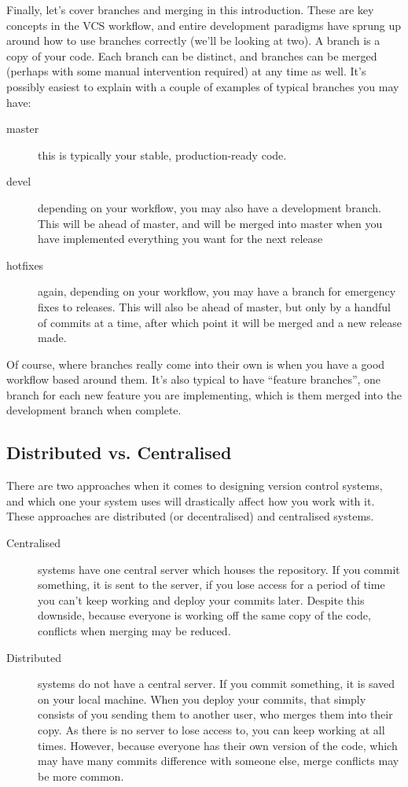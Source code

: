 \documentclass[12pt,a4paper]{article}
\begin{document}
Finally, let's cover branches and merging in this introduction. These
are key concepts in the VCS workflow, and entire development paradigms
have sprung up around how to use branches correctly (we'll be looking
at two). A branch is a copy of your code. Each branch can be distinct,
and branches can be merged (perhaps with some manual intervention
required) at any time as well. It's possibly easiest to explain with
a couple of examples of typical branches you may have:

\begin{description}
  \item[master] this is typically your stable, production-ready
    code.
  \item[devel] depending on your workflow, you may also have a
    development branch. This will be ahead of master, and will be
    merged into master when you have implemented everything you want
    for the next release
  \item[hotfixes] again, depending on your workflow, you may have a
    branch for emergency fixes to releases. This will also be ahead of
    master, but only by a handful of commits at a time, after which
    point it will be merged and a new release made.
\end{description}

Of course, where branches really come into their own is when you have
a good workflow based around them. It's also typical to have ``feature
branches'', one branch for each new feature you are implementing,
which is them merged into the development branch when complete.

\subsection{Distributed vs. Centralised}

There are two approaches when it comes to designing version control
systems, and which one your system uses will drastically affect how
you work with it. These approaches are distributed (or decentralised)
and centralised systems.

\begin{description}
  \item[Centralised] systems have one central server which houses the
    repository. If you commit something, it is sent to the server, if
    you lose access for a period of time you can't keep working and
    deploy your commits later. Despite this downside, because everyone
    is working off the same copy of the code, conflicts when merging
    may be reduced.
  \item[Distributed] systems do not have a central server. If you
    commit something, it is saved on your local machine. When you
    deploy your commits, that simply consists of you sending them to
    another user, who merges them into their copy. As there is no
    server to lose access to, you can keep working at all
    times. However, because everyone has their own version of the
    code, which may have many commits difference with someone else,
    merge conflicts may be more common.
\end{description}
\end{document}
